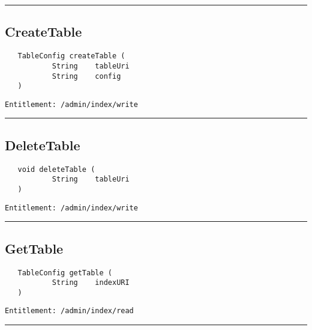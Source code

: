 \rule{12cm}{2pt}
\subsection{CreateTable}
\label{Api:CreateTable}
\begin{verbatim}
   TableConfig createTable (
           String    tableUri
           String    config
   )
\end{verbatim}
\begin{Verbatim}[fontsize=\small, formatcom=\color{Maroon}]
  Entitlement: /admin/index/write
\end{Verbatim}



\rule{12cm}{2pt}
\subsection{DeleteTable}
\label{Api:DeleteTable}
\begin{verbatim}
   void deleteTable (
           String    tableUri
   )
\end{verbatim}
\begin{Verbatim}[fontsize=\small, formatcom=\color{Maroon}]
  Entitlement: /admin/index/write
\end{Verbatim}



\rule{12cm}{2pt}
\subsection{GetTable}
\label{Api:GetTable}
\begin{verbatim}
   TableConfig getTable (
           String    indexURI
   )
\end{verbatim}
\begin{Verbatim}[fontsize=\small, formatcom=\color{Maroon}]
  Entitlement: /admin/index/read
\end{Verbatim}



\rule{12cm}{2pt}
